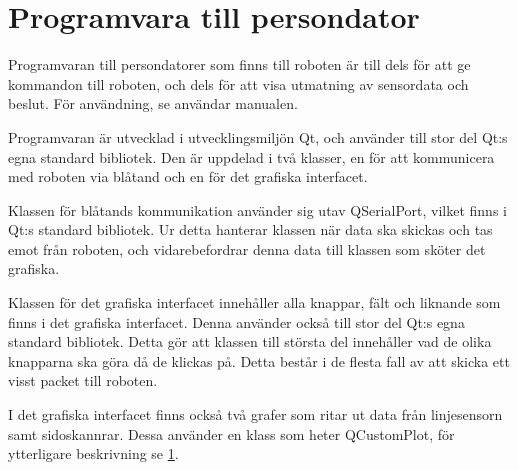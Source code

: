 \section{Programvara till persondator}
Programvaran till persondatorer som finns till roboten är till dels för att ge kommandon till roboten, och dels för att visa utmatning av sensordata och beslut. För användning, se användar manualen.

Programvaran är utvecklad i utvecklingsmiljön Qt, och använder till stor del Qt:s egna standard bibliotek. Den är uppdelad i två klasser, en för att kommunicera med roboten via blåtand och en för det grafiska interfacet.

Klassen för blåtands kommunikation använder sig utav QSerialPort, vilket finns i Qt:s standard bibliotek. Ur detta hanterar klassen när data ska skickas och tas emot från roboten, och vidarebefordrar denna data till klassen som sköter det grafiska.

Klassen för det grafiska interfacet innehåller alla knappar, fält och liknande som finns i det grafiska interfacet. Denna använder också till stor del Qt:s egna standard bibliotek. Detta gör att klassen till största del innehåller vad de olika knapparna ska göra då de klickas på. Detta består i de flesta fall av att skicka ett visst packet till roboten.

I det grafiska interfacet finns också två grafer som ritar ut data från linjesensorn samt sidoskannrar. Dessa använder en klass som heter QCustomPlot, för ytterligare beskrivning se \ref{}.  